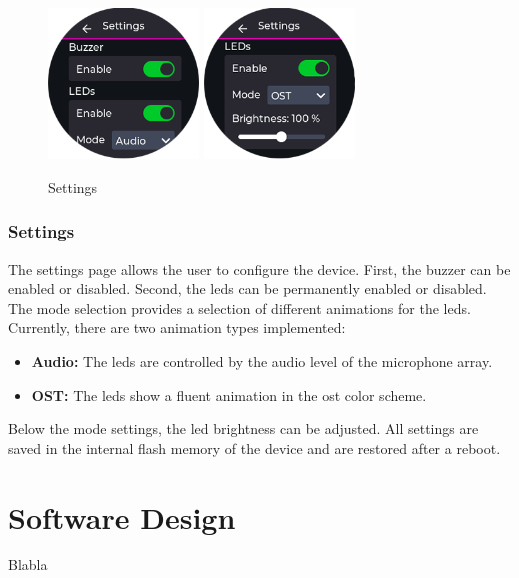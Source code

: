 \begin{minipage}{\linewidth}
	\begin{figure}
		\vspace{-0.6cm}
		\includegraphics[width=4cm, trim={0 -1.0cm 0 0}]{images/6_design_final/gui/13_settings.png}
		\includegraphics[width=4cm]{images/6_design_final/gui/14_settings.png}
		\centering
		\caption{Settings}
		\label{fig:final_design_gui_settings}
	\end{figure}
	\subsubsection{Settings}
	The settings page allows the user to configure the device.
	First, the buzzer can be enabled or disabled.
	Second, the \acrshort{led}s can be permanently enabled or disabled.
	The mode selection provides a selection of different animations for the \acrshort{led}s.
	Currently, there are two animation types implemented:
	\begin{itemize}
		\setlength{\itemindent}{5mm}
		\setlength{\leftmargin}{10mm}
		\item \textbf{Audio:} The \acrshort{led}s are controlled by the audio level of the microphone array.
		\item \textbf{OST:} The \acrshort{led}s show a fluent animation in the \acrshort{ost} color scheme.
	\end{itemize}
	Below the mode settings, the \acrshort{led} brightness can be adjusted.
	All settings are saved in the internal flash memory of the device and are restored after a reboot.
\end{minipage}


\newpage
\section{Software Design}
Blabla




